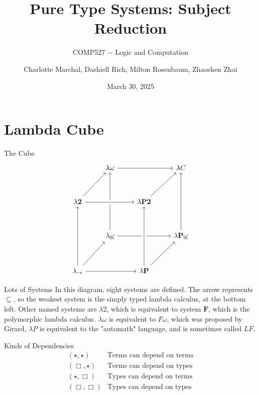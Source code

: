 \documentclass{beamer}
\title{\normalsize{Pure Type Systems: Subject Reduction}\vspace{0.05in}}
\author{\small Charlotte Marchal, Dashiell Rich, Milton Rosenbaum, Zhaoshen Zhai}
\subtitle{\scriptsize{COMP527 $-$ Logic and Computation}}
\date{\footnotesize March 30, 2025}
\begin{document}
\frame{\titlepage}
    \section{Lambda Cube}

    \begin{frame}{The Cube}
        \[\begin{tikzcd}[ampersand replacement=\&, row sep=3.4em]
            \& \lambda\omega \arrow[rr] \arrow[from=dd] \&\& \lambda C \\
            \lambda \textbf{2} \arrow[ur] \arrow[rr, crossing over] \&\& \lambda \textbf{P2} \arrow[ur] \& \\
            \& \lambda\underline{\omega} \arrow[rr] \&\& \lambda \textbf{P} \underline{\omega} \arrow[uu] \\
            \lambda_\rightarrow \arrow[uu] \arrow[rr] \arrow[ur] \&\& \lambda \textbf{P} \arrow[ur] \arrow[uu, crossing over]
        \end{tikzcd}\]
    \end{frame}

    \begin{frame}{Lots of Systems}
        In this diagram, eight systems are defined. The arrow represents $\subseteq$, so the weakest system is the simply typed lambda calculus, at the bottom left. Other named systems are $\lambda 2$, which is equivalent to system $\textbf{F}$, which is the polymorphic lambda calculus. $\lambda\omega$ is equivalent to $F\omega$, which was proposed by Girard, $\lambda P$ is equivalent to the "automath" language, and is sometimes called $LF$.
    \end{frame}

    \begin{frame}{Kinds of Dependencies}
        \[\begin{array}{c|l}
            (\star, \star) & \text{Terms can depend on terms} \\
            (\Box, \star) & \text{Terms can depend on types} \\
            (\star, \Box) & \text{Types can depend on terms} \\
            (\Box, \Box) & \text{Types can depend on types} \\
        \end{array}\]
    \end{frame}
\end{document}
